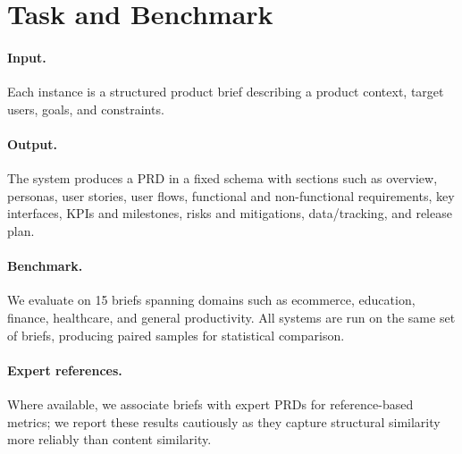 \section{Task and Benchmark}
\label{sec:task}

\paragraph{Input.}
Each instance is a structured product brief describing a product context, target users, goals, and constraints.

\paragraph{Output.}
The system produces a PRD in a fixed schema with sections such as overview, personas, user stories, user flows, functional and non-functional requirements, key interfaces, KPIs and milestones, risks and mitigations, data/tracking, and release plan.

\paragraph{Benchmark.}
We evaluate on 15 briefs spanning domains such as ecommerce, education, finance, healthcare, and general productivity.
All systems are run on the same set of briefs, producing paired samples for statistical comparison.

\paragraph{Expert references.}
Where available, we associate briefs with expert PRDs for reference-based metrics; we report these results cautiously as they capture structural similarity more reliably than content similarity.


